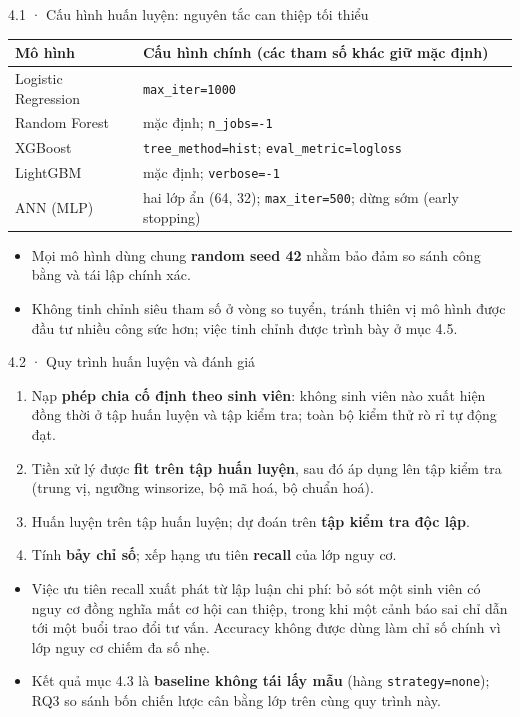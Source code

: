 \documentclass[aspectratio=169,11pt]{beamer}
\begin{document}
\begin{frame}{4.1 · Cấu hình huấn luyện: nguyên tắc can thiệp tối thiểu}
\small
\begin{tabular}{@{}ll@{}}
\toprule
\textbf{Mô hình} & \textbf{Cấu hình chính (các tham số khác giữ mặc định)} \\
\midrule
Logistic Regression & \texttt{max\_iter=1000} \\
Random Forest & mặc định; \texttt{n\_jobs=-1} \\
XGBoost & \texttt{tree\_method=hist}; \texttt{eval\_metric=logloss} \\
LightGBM & mặc định; \texttt{verbose=-1} \\
ANN (MLP) & hai lớp ẩn (64, 32); \texttt{max\_iter=500}; dừng sớm (early stopping) \\
\bottomrule
\end{tabular}
\vspace{4mm}
\begin{itemize}
  \item Mọi mô hình dùng chung \textbf{random seed 42} nhằm bảo đảm so sánh công bằng và tái lập chính xác.
  \item Không tinh chỉnh siêu tham số ở vòng so tuyển, tránh thiên vị mô hình được đầu tư nhiều công sức hơn; việc tinh chỉnh được trình bày ở mục 4.5.
\end{itemize}
\end{frame}

\begin{frame}{4.2 · Quy trình huấn luyện và đánh giá}
\begin{enumerate}
  \item Nạp \textbf{phép chia cố định theo sinh viên}: không sinh viên nào xuất hiện đồng thời ở tập huấn luyện và tập kiểm tra; toàn bộ kiểm thử rò rỉ tự động đạt.
  \item Tiền xử lý được \textbf{fit trên tập huấn luyện}, sau đó áp dụng lên tập kiểm tra (trung vị, ngưỡng winsorize, bộ mã hoá, bộ chuẩn hoá).
  \item Huấn luyện trên tập huấn luyện; dự đoán trên \textbf{tập kiểm tra độc lập}.
  \item Tính \textbf{bảy chỉ số}; xếp hạng ưu tiên \textbf{recall} của lớp nguy cơ.
\end{enumerate}
\vspace{3mm}
\begin{itemize}
  \item Việc ưu tiên recall xuất phát từ lập luận chi phí: bỏ sót một sinh viên có nguy cơ đồng nghĩa mất cơ hội can thiệp, trong khi một cảnh báo sai chỉ dẫn tới một buổi trao đổi tư vấn. Accuracy không được dùng làm chỉ số chính vì lớp nguy cơ chiếm đa số nhẹ.
  \item Kết quả mục 4.3 là \textbf{baseline không tái lấy mẫu} (hàng \texttt{strategy=none}); RQ3 so sánh bốn chiến lược cân bằng lớp trên cùng quy trình này.
\end{itemize}
\end{frame}
\end{document}
